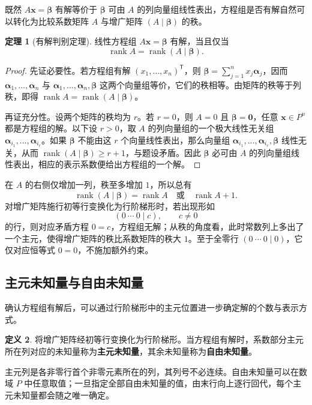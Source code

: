 \documentclass[UTF8, fontset=fandol, a4paper, 12pt]{ctexart}
\newcommand{\rank}{\operatorname{rank}}
\newcommand{\vx}{\boldsymbol{x}}
\newcommand{\vb}{\boldsymbol{\beta}}
\newcommand{\vo}{\boldsymbol{0}}
\newcommand{\va}{\boldsymbol{\alpha}}
\theoremstyle{definition}
\newtheorem{definition}{定义}[section]
\newtheorem{theorem}[definition]{定理}
\begin{document}
既然 $A\vx=\vb$ 有解等价于 $\vb$ 可由 $A$ 的列向量组线性表出，方程组是否有解自然可以转化为比较系数矩阵 $A$ 与增广矩阵 $(A\mid\vb)$ 的秩。

\begin{theorem}[有解判别定理]
线性方程组 $A\vx=\vb$ 有解，当且仅当
\[
 \boxed{\rank A=\rank(A\mid\vb).}
\]
\end{theorem}
\begin{proof}
先证必要性。若方程组有解 $(x_1,\ldots,x_n)^{\mathsf T}$，则 $\vb=\sum_{j=1}^n x_j\va_j$，因而 $\va_1,\ldots,\va_n$ 与 $\va_1,\ldots,\va_n,\vb$ 这两个向量组等价，它们的秩相等。由矩阵的秩等于列秩，即得 $\rank A=\rank(A\mid\vb)$。

再证充分性。设两个矩阵的秩均为 $r$。若 $r=0$，则 $A=0$ 且 $\vb=\vo$，任意 $\vx\in P^n$ 都是方程组的解。以下设 $r>0$，取 $A$ 的列向量组的一个极大线性无关组 $\va_{i_1},\ldots,\va_{i_r}$。如果 $\vb$ 不能由这 $r$ 个向量线性表出，那么向量组 $\va_{i_1},\ldots,\va_{i_r},\vb$ 线性无关，从而 $\rank(A\mid\vb)\ge r+1$，与题设矛盾。因此 $\vb$ 必可由 $A$ 的列向量组线性表出，相应的表示系数便给出方程组的一个解。
\end{proof}

在 $A$ 的右侧仅增加一列，秩至多增加 $1$，所以总有
\[
 \rank(A\mid\vb)=\rank A\quad\text{或}\quad\rank A+1.
\]
对增广矩阵施行初等行变换化为行阶梯形时，若出现形如
\[
 (0\ \cdots\ 0\mid c),\qquad c\ne0
\]
的行，则对应矛盾方程 $0=c$，方程组无解；从秩的角度看，此时常数列上多出了一个主元，使得增广矩阵的秩比系数矩阵的秩大 $1$。至于全零行 $(0\ \cdots\ 0\mid0)$，它仅对应恒等式 $0=0$，不施加额外约束。

\subsection{主元未知量与自由未知量}

确认方程组有解后，可以通过行阶梯形中的主元位置进一步确定解的个数与表示方式。

\begin{definition}
将增广矩阵经初等行变换化为行阶梯形。当方程组有解时，系数部分主元所在列对应的未知量称为\textbf{主元未知量}，其余未知量称为\textbf{自由未知量}。
\end{definition}

主元列是各非零行首个非零元素所在的列，其列号不必连续。自由未知量可以在数域 $P$ 中任意取值；一旦指定全部自由未知量的值，由末行向上逐行回代，每个主元未知量都会随之唯一确定。
\end{document}
